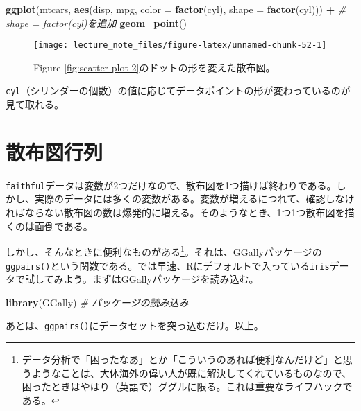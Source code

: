 \documentclass[]{book}
\newenvironment{Shaded}{\begin{snugshade}}{\end{snugshade}}
\newcommand{\KeywordTok}[1]{\textcolor[rgb]{0.13,0.29,0.53}{\textbf{#1}}}
\newcommand{\DataTypeTok}[1]{\textcolor[rgb]{0.13,0.29,0.53}{#1}}
\newcommand{\StringTok}[1]{\textcolor[rgb]{0.31,0.60,0.02}{#1}}
\newcommand{\CommentTok}[1]{\textcolor[rgb]{0.56,0.35,0.01}{\textit{#1}}}
\newcommand{\OperatorTok}[1]{\textcolor[rgb]{0.81,0.36,0.00}{\textbf{#1}}}
\newcommand{\NormalTok}[1]{#1}
\let\rmarkdownfootnote\footnote%
\def\footnote{\protect\rmarkdownfootnote}
\begin{document}
\begin{Shaded}
\begin{Highlighting}[]
\KeywordTok{ggplot}\NormalTok{(mtcars, }\KeywordTok{aes}\NormalTok{(disp, mpg, }\DataTypeTok{color =} \KeywordTok{factor}\NormalTok{(cyl), }\DataTypeTok{shape =} \KeywordTok{factor}\NormalTok{(cyl))) }\OperatorTok{+}\StringTok{ }\CommentTok{# shape = factor(cyl)を追加}
\StringTok{  }\KeywordTok{geom_point}\NormalTok{()}
\end{Highlighting}
\end{Shaded}

\begin{figure}

{\centering \texttt{[image: lecture\_note\_files/figure-latex/unnamed-chunk-52-1]} 

}

\caption{Figure
\ref{fig:scatter-plot-2}のドットの形を変えた散布図。}\label{fig:unnamed-chunk-52}
\end{figure}

\texttt{cyl}（シリンダーの個数）の値に応じてデータポイントの形が変わっているのが見て取れる。

\section{散布図行列}

\texttt{faithful}データは変数が2つだけなので、散布図を1つ描けば終わりである。しかし、実際のデータには多くの変数がある。変数が増えるにつれて、確認しなければならない散布図の数は爆発的に増える。そのようなとき、1つ1つ散布図を描くのは面倒である。

しかし、そんなときに便利なものがある\footnote{データ分析で「困ったなあ」とか「こういうのあれば便利なんだけど」と思うようなことは、大体海外の偉い人が既に解決してくれているものなので、困ったときはやはり（英語で）ググルに限る。これは重要なライフハックである。}。それは、GGallyパッケージの\texttt{ggpairs()}という関数である。では早速、Rにデフォルトで入っている\texttt{iris}データで試してみよう。まずはGGallyパッケージを読み込む。

\begin{Shaded}
\begin{Highlighting}[]
\KeywordTok{library}\NormalTok{(GGally) }\CommentTok{# パッケージの読み込み}
\end{Highlighting}
\end{Shaded}

あとは、\texttt{ggpairs()}にデータセットを突っ込むだけ。以上。
\end{document}
